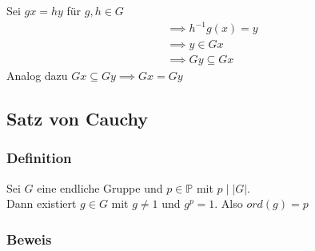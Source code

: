 \documentclass[12pt, german]{article}
\begin{document}
	Sei $gx = hy$ für $g,h \in G$
	\begin{align*}
		&\implies h^{-1}g(x) = y \\
		&\implies y \in Gx \\
		&\implies Gy \subseteq Gx
	\end{align*}
	Analog dazu $Gx \subseteq Gy \implies Gx = Gy$


\subsection{Satz von Cauchy}		
\subsubsection{Definition}
	Sei $G$ eine endliche Gruppe und $p \in \mathbb P$ mit $p \mid |G|$. \\
	Dann existiert $g \in G$ mit $g \not = 1$ und $ g^p = 1$. Also $ord(g)= p$
\subsubsection{Beweis}
\end{document}
